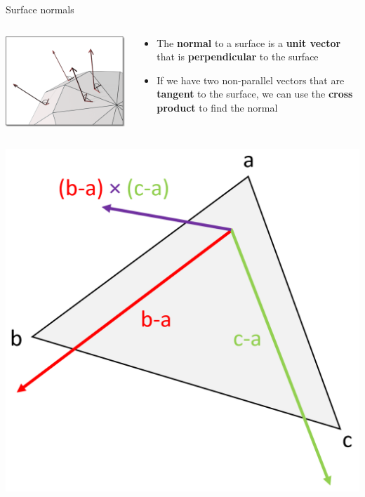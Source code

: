 \begin{frame}{Surface normals}
	\begin{columns}
		\pause
		\begin{column}{0.33\textwidth}
			\includegraphics[width=\textwidth]{surface_normal}
		\end{column}
		\begin{column}{0.65\textwidth}
			\begin{itemize}
				\item The \textbf{normal} to a surface is a \textbf{unit vector} that is \textbf{perpendicular} to the surface
				\pause\item If we have two non-parallel vectors that are \textbf{tangent} to the surface, we can use the \textbf{cross product} to find the normal
			\end{itemize}
		\end{column}
	\end{columns}
	\pause
	\begin{columns}
		\begin{column}{0.33\textwidth}
			\includegraphics[width=\textwidth]{triangle_normal}

\end{column}
\end{columns}
\end{frame}
